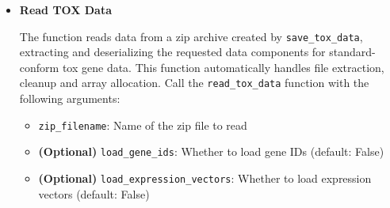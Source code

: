 \begin{enumerate}
\begin{itemize}
\begin{itemize}
                    \item \textbf{(Optional)} \texttt{family\_centroids}: 2D array of
                          family centroids
                          
                    \item \textbf{(Optional)} \texttt{shift\_vectors}: 2D array of shift
                          vectors
                          
                    \item Corresponding \texttt{*\_name} parameters for temporary
                          filenames (e.g., \texttt{gene\_ids\_name}, \texttt{expression\_vectors\_name},
                          etc.)
                  \end{itemize}
                  
                  \begin{lstlisting}[language=Python, caption={Python Save TOX Data}]
save_tox_data(zip_filename, gene_ids=None, expression_vectors=None, 
        gene_to_fam=None, family_ids=None, family_centroids=None, 
        shift_vectors=None, gene_ids_name=None, 
        expression_vectors_name=None, gene_to_fam_name=None, 
        family_ids_name=None, family_centroids_name=None, 
        shift_vectors_name=None)
                  \end{lstlisting}
                  
            \item \textbf{Read TOX Data}
                  
                  The function reads data from a zip archive created by \texttt{save\_tox\_data},
                  extracting and deserializing the requested data components for standard-conform
                  tox gene data. This function automatically handles file extraction, cleanup
                  and array allocation. Call the \texttt{read\_tox\_data} function with the
                  following arguments:
                  
                  \begin{itemize}
                    \item \texttt{zip\_filename}: Name of the zip file to read
                          
                    \item \textbf{(Optional)} \texttt{load\_gene\_ids}: Whether to load
                          gene IDs (default: False)
                          
                    \item \textbf{(Optional)} \texttt{load\_expression\_vectors}:
                          Whether to load expression vectors (default: False)
                          

\end{itemize}
\end{itemize}
\end{enumerate}
